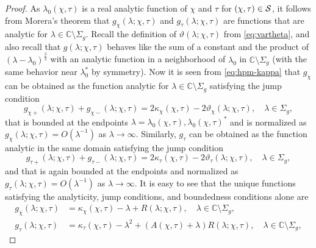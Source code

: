 \begin{proof} 
As $\lambda_0(\chi,\tau)$ is a real analytic function of $\chi$ and $\tau$ for $(\chi,\tau)\in \mathcal{S}$, it follows from Morera's theorem that $g_\chi(\lambda;\chi,\tau)$ and $g_\tau(\lambda;\chi,\tau)$ are functions that are analytic for $\lambda\in \mathbb{C}\setminus \Sigma_g$. 
Recall the definition of $\vartheta(\lambda;\chi,\tau)$ from \eqref{eq:vartheta}, and also recall that $g(\lambda;\chi,\tau)$ behaves like the sum of a constant and the product of $(\lambda-\lambda_0)^{\frac{3}{2}}$ with an analytic function in a neighborhood of $\lambda_0$ in $\mathbb{C}\setminus \Sigma_g$ (with the same behavior near $\lambda_0^*$ by symmetry). 
Now it is seen from \eqref{eq:hpm-kappa} that $g_\chi$ can be obtained as the function analytic for $\lambda\in\mathbb{C}\setminus\Sigma_g$ satisfying the jump condition
\begin{equation}
g_{\chi+}(\lambda;\chi,\tau) + g_{\chi-}(\lambda;\chi,\tau) = 2 \kappa_\chi(\chi,\tau) - 2\vartheta_\chi(\lambda;\chi,\tau),\quad \lambda\in\Sigma_g,
\label{eq:g-chi-jump}
\end{equation}
that is bounded at the endpoints $\lambda=\lambda_0(\chi,\tau), \lambda_0(\chi,\tau)^*$ and is normalized as $g_\chi(\lambda;\chi,\tau)=O(\lambda^{-1})$ as $\lambda\to\infty$. Similarly, $g_\tau$ can be obtained as the function analytic in the same domain satisfying the jump condition
\begin{equation}
g_{\tau+}(\lambda;\chi,\tau) + g_{\tau-}(\lambda;\chi,\tau) = 2 \kappa_\tau(\chi,\tau) - 2 \vartheta_\tau(\lambda;\chi,\tau),\quad \lambda\in\Sigma_g,
\label{eq:g-tau-jump}
\end{equation}
and that is again bounded at the endpoints and normalized as $g_\tau(\lambda;\chi,\tau)=O(\lambda^{-1})$ as $\lambda\to\infty$. 
It is easy to see that the unique functions satisfying the analyticity, jump conditions, and boundedness conditions alone are
\begin{align}
g_\chi (\lambda;\chi,\tau) &=  \kappa_{\chi}(\chi,\tau)-\lambda + R(\lambda;\chi,\tau),\quad\lambda\in\mathbb{C}\setminus\Sigma_g,\label{eq:g-chi-integrated}\\
g_\tau(\lambda;\chi,\tau) &=  \kappa_{\tau}(\chi,\tau) - \lambda^{2}  + ( A(\chi,\tau) + \lambda ) R(\lambda;\chi,\tau),\quad\lambda\in\mathbb{C}\setminus\Sigma_g,\label{eq:g-tau-integrated}

\end{align}
\end{proof}
